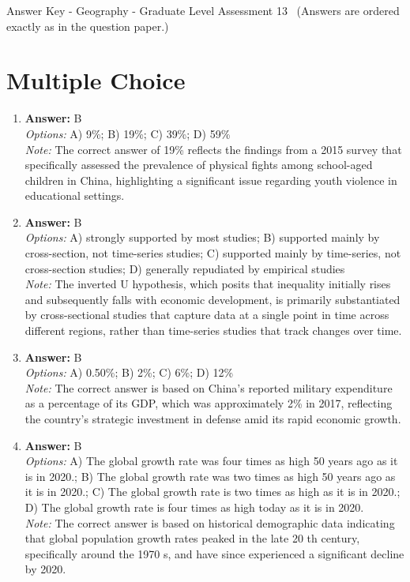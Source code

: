 \documentclass[12pt]{article}
\begin{document}
\begin{center}
Answer Key - Geography - Graduate Level Assessment 13 \
\small (Answers are ordered exactly as in the question paper.)
\end{center}

\section*{Multiple Choice}
\begin{enumerate}[label=\arabic*.]
\item \textbf{Answer:} B
\\ \textit{Options:} A) 9\%; B) 19\%; C) 39\%; D) 59\%
\\ \textit{Note:} The correct answer of 19\% reflects the findings from a 2015 survey that specifically assessed the prevalence of physical fights among school-aged children in China, highlighting a significant issue regarding youth violence in educational settings.
\item \textbf{Answer:} B
\\ \textit{Options:} A) strongly supported by most studies; B) supported mainly by cross-section, not time-series studies; C) supported mainly by time-series, not cross-section studies; D) generally repudiated by empirical studies
\\ \textit{Note:} The inverted U hypothesis, which posits that inequality initially rises and subsequently falls with economic development, is primarily substantiated by cross-sectional studies that capture data at a single point in time across different regions, rather than time-series studies that track changes over time.
\item \textbf{Answer:} B
\\ \textit{Options:} A) 0.50\%; B) 2\%; C) 6\%; D) 12\%
\\ \textit{Note:} The correct answer is based on China's reported military expenditure as a percentage of its GDP, which was approximately 2\% in 2017, reflecting the country's strategic investment in defense amid its rapid economic growth.
\item \textbf{Answer:} B
\\ \textit{Options:} A) The global growth rate was four times as high 50 years ago as it is in 2020.; B) The global growth rate was two times as high 50 years ago as it is in 2020.; C) The global growth rate is two times as high as it is in 2020.; D) The global growth rate is four times as high today as it is in 2020.
\\ \textit{Note:} The correct answer is based on historical demographic data indicating that global population growth rates peaked in the late 20 th century, specifically around the 1970 s, and have since experienced a significant decline by 2020.

\end{enumerate}
\end{document}
